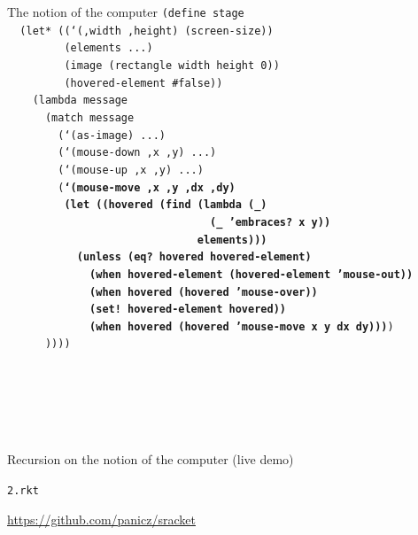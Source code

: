 \documentclass{beamer}
\begin{document}
\begin{frame}{The notion of the computer}
  \scriptsize
  \texttt{(define stage\\
    \ \ (let* ((`(,width ,height) (screen-size))\\
    \ \ \ \ \ \ \ \ \ (elements ...)\\
    \ \ \ \ \ \ \ \ \ (image (rectangle width height 0))\\
    \ \ \ \ \ \ \ \ \ (hovered-element \#false))\\
    \ \ \ \ (lambda message\\
    \ \ \ \ \ \ (match message\\
    \ \ \ \ \ \ \ \ (`(as-image) ...)\\
    \ \ \ \ \ \ \ \ (`(mouse-down ,x ,y) ...)\\
    \ \ \ \ \ \ \ \ (`(mouse-up ,x ,y) ...)\\
    \ \ \ \ \ \ \ \ (\textbf{`(mouse-move ,x ,y ,dx ,dy)\\
      \ \ \ \ \ \ \ \ \ (let ((hovered (find (lambda (\_)\\
      \ \ \ \ \ \ \ \ \ \ \ \ \ \ \ \ \ \ \ \ \ \ \ \ \ \ \ \ \ \ \ \ (\_ 'embraces? x y)) \\
      \ \ \ \ \ \ \ \ \ \ \ \ \ \ \ \ \ \ \ \ \ \ \ \ \ \ \ \ \ \ elements)))\\
    \ \ \ \ \ \ \ \ \ \ \ (unless (eq? hovered hovered-element)\\
    \ \ \ \ \ \ \ \ \ \ \ \ \ (when hovered-element (hovered-element 'mouse-out))\\
    \ \ \ \ \ \ \ \ \ \ \ \ \ (when hovered (hovered 'mouse-over))\\
    \ \ \ \ \ \ \ \ \ \ \ \ \ (set! hovered-element hovered))\\
    \ \ \ \ \ \ \ \ \ \ \ \ \ (when hovered (hovered 'mouse-move x y dx dy)))})\\
    \ \ \ \ \ \ ))))\\
    \ \\
    \ \\
    \ \\
    \ \\
    \ 
}
\end{frame}


\begin{frame}{Recursion on the notion of the computer (live demo)}
  \begin{center}
    \Huge
    \texttt{2.rkt}
  \end{center}
  \url{https://github.com/panicz/sracket}
\end{frame}
\end{document}

